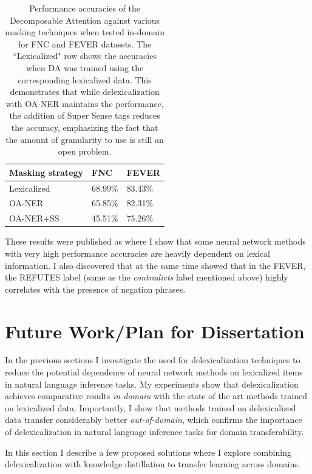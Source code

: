 \documentclass{article}
\begin{document}
\begin{table}[h!]
\begin{center}
\begin{tabular}{|p{20mm}|p{9mm}|p{10mm}|}
 \hline
\textbf{Masking strategy} & \textbf{FNC}  & \textbf{FEVER}  \\ 
\hline
Lexicalized &68.99\% &83.43\% \\
OA-NER &65.85\% &82.31\%\\
OA-NER+SS & 45.51\% &75.26\%\\
\hline
\end{tabular}
\end{center}
    \caption{Performance accuracies of the Decomposable Attention against various masking techniques when tested in-domain for FNC and FEVER datasets. The ``Lexicalized" row shows the accuracies when DA was trained using the corresponding lexicalized data. This demonstrates that while delexicalization with OA-NER maintains the performance, the addition of Super Sense tags reduces the accuracy, emphasizing the fact that the amount of granularity to use is still an open problem.}
    \label{sstag}
\end{table}

These results were published as \citep*{emnlp2019sandeep} where I show that some neural network methods with very high performance accuracies are heavily dependent on lexical information. I also discovered that at the same time  \citep*{schuster2019towards} showed that in the FEVER, the REFUTES label (same as the \textit{contradicts} label mentioned above) highly correlates with the presence of negation phrases. 

\section{Future Work/Plan for Dissertation}
In the previous sections I investigate the need for delexicalization techniques to reduce the potential dependence of neural network methods on lexicalized items in natural language inference tasks. My experiments show that delexicalization achieves comparative results {\em in-domain} with the state of the art methods trained on lexicalized data. Importantly, I show that methods trained on delexicalized data transfer considerably better {\em out-of-domain}, which  confirms the importance of delexicalization in natural language inference tasks for domain transferability.

In this section I describe a few proposed solutions where I explore combining delexicalization with knowledge distillation to transfer learning across domains.
\end{document}

